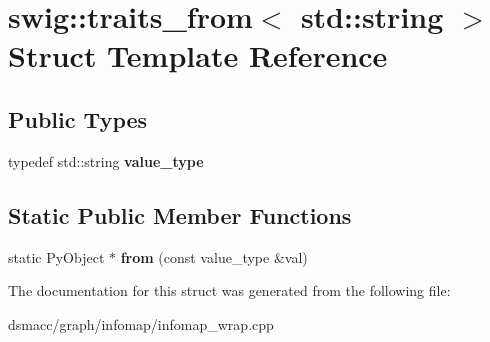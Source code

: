 \hypertarget{structswig_1_1traits__from_3_01std_1_1string_01_4}{}\section{swig\+:\+:traits\+\_\+from$<$ std\+:\+:string $>$ Struct Template Reference}
\label{structswig_1_1traits__from_3_01std_1_1string_01_4}
\subsection*{Public Types}
\begin{DoxyCompactItemize}
\item 
\mbox{\label{structswig_1_1traits__from_3_01std_1_1string_01_4_a873f8111e50ab64c5f0711f3fc8479ad}} 
typedef std\+::string {\bfseries value\+\_\+type}
\end{DoxyCompactItemize}
\subsection*{Static Public Member Functions}
\begin{DoxyCompactItemize}
\item 
\mbox{\label{structswig_1_1traits__from_3_01std_1_1string_01_4_af6e0987239b6f657facf1fc5fcbddea6}} 
static Py\+Object $\ast$ {\bfseries from} (const value\+\_\+type \&val)
\end{DoxyCompactItemize}


The documentation for this struct was generated from the following file\+:\begin{DoxyCompactItemize}
\item 
dsmacc/graph/infomap/infomap\+\_\+wrap.\+cpp\end{DoxyCompactItemize}
